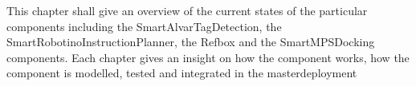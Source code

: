 This chapter shall give an overview of the current states of the particular components including the SmartAlvarTagDetection, the SmartRobotinoInstructionPlanner, the Refbox and the SmartMPSDocking components. Each chapter gives an insight on how the component works, how the component is modelled, tested and integrated in the masterdeployment
